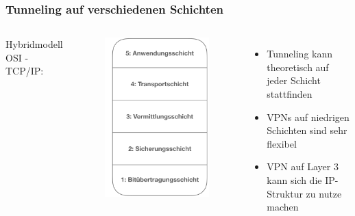\documentclass[hyperref={pdfpagelabels=false},xcolor=dvipsnames]{beamer}
\newcommand*\mi{ \item[\color{gray}\scalebox{1.2}{\textbullet}]}
\begin{document}
\begin{frame}
	\frametitle{Tunneling auf verschiedenen Schichten}
	\begin{columns}
		\centering Hybridmodell OSI - TCP/IP: 
		\begin{figure}
			\includegraphics[width=\textwidth]{schichten.001.jpeg} 	
		\end{figure}

		\begin{itemize}
			\mi Tunneling kann theoretisch auf jeder Schicht stattfinden
			\mi VPNs auf niedrigen Schichten sind sehr flexibel 
			\mi VPN auf Layer 3 kann sich die IP-Struktur zu nutze machen
				
		\end{itemize}
	
		
	\end{columns}

		
\end{frame}
\end{document}
